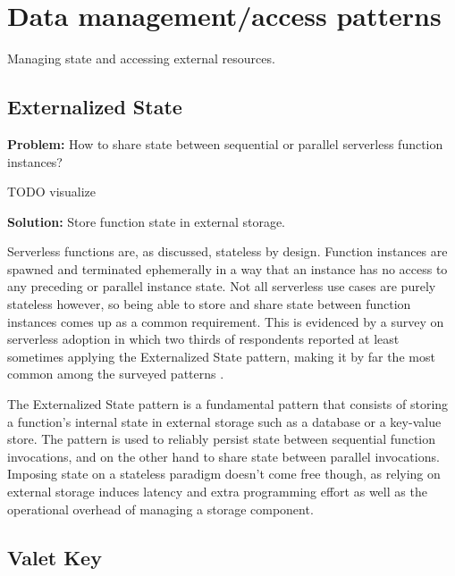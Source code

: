 
\section{Data management/access patterns} \label{sec:dataManagementPatterns}

Managing state and accessing external resources.

\subsection{Externalized State} \label{subsec:externalizedState}

\textbf{Problem:} How to share state between sequential or parallel serverless function instances?

TODO visualize

\textbf{Solution:} Store function state in external storage.

Serverless functions are, as discussed, stateless by design. Function instances are spawned and terminated ephemerally in a way that an instance has no access to any preceding or parallel instance state. Not all serverless use cases are purely stateless however, so being able to store and share state between function instances comes up as a common requirement. This is evidenced by a survey on serverless adoption in which two thirds of respondents reported at least sometimes applying the Externalized State pattern, making it by far the most common among the surveyed patterns \parencite{leitner18industrialpractice}.

The Externalized State pattern is a fundamental pattern that consists of storing a function's internal state in external storage such as a database or a key-value store. The pattern is used to reliably persist state between sequential function invocations, and on the other hand to share state between parallel invocations. Imposing state on a stateless paradigm doesn't come free though, as relying on external storage induces latency and extra programming effort as well as the operational overhead of managing a storage component. \parencite{leitner18industrialpractice}

\subsection{Valet Key} \label{subsec:valetKey}

